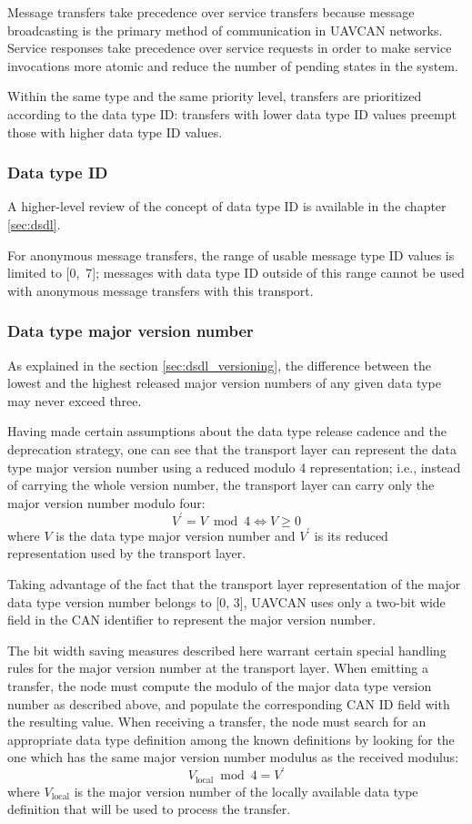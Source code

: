 Message transfers take precedence over service transfers because message broadcasting is the primary method of
communication in UAVCAN networks.
Service responses take precedence over service requests in order to make service invocations more atomic
and reduce the number of pending states in the system.

Within the same type and the same priority level,
transfers are prioritized according to the data type ID:
transfers with lower data type ID values preempt those with higher data type ID values.

\subsubsection{Data type ID}

A higher-level review of the concept of data type ID is available in the chapter \ref{sec:dsdl}.

For anonymous message transfers, the range of usable message type ID values is limited to [0,~7];
messages with data type ID outside of this range cannot be used with anonymous message
transfers with this transport.

\subsubsection{Data type major version number}

As explained in the section \ref{sec:dsdl_versioning},
the difference between the lowest and the highest released major version numbers of any given data type
may never exceed three.

Having made certain assumptions about the data type release cadence and the deprecation strategy,
one can see that the transport layer can represent the data type major version number using a reduced
modulo 4 representation; i.e., instead of carrying the whole version number, the transport layer
can carry only the major version number modulo four:
$$V^\prime{} = V \bmod 4 \Leftrightarrow{} V \geq{} 0$$
where $V$ is the data type major version number and $V^\prime{}$ is its reduced representation used by
the transport layer.

Taking advantage of the fact that the transport layer representation of the major data type version number
belongs to [0, 3], UAVCAN uses only a two-bit wide field in the CAN identifier to represent the major
version number.

The bit width saving measures described here warrant certain special handling rules for the major version
number at the transport layer.
When emitting a transfer, the node must compute the modulo of the major data type version number
as described above, and populate the corresponding CAN ID field with the resulting value.
When receiving a transfer, the node must search for an appropriate data type definition
among the known definitions by looking for the one which has the same major version number modulus
as the received modulus:
$$V_\text{local} \bmod 4 = V^\prime{}$$
where $V_\text{local}$ is the major version number of the locally available data type definition that will be used
to process the transfer.

